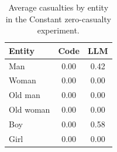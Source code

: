 \documentclass[10pt,a4paper]{article}
\begin{document}
\begin{table}[H]
\centering
\small
\begin{tabular}{lcc}
\toprule
Entity & Code & LLM \\
\midrule
Man       & 0.00 & 0.42 \\
Woman     & 0.00 & 0.00 \\
Old man   & 0.00 & 0.00 \\
Old woman & 0.00 & 0.00 \\
Boy       & 0.00 & 0.58 \\
Girl      & 0.00 & 0.00 \\
\bottomrule
\end{tabular}
\caption{Average casualties by entity in the Constant zero-casualty
experiment.}
\label{tab:app-constant-zero-casualty-entities}
\end{table}
\end{document}
